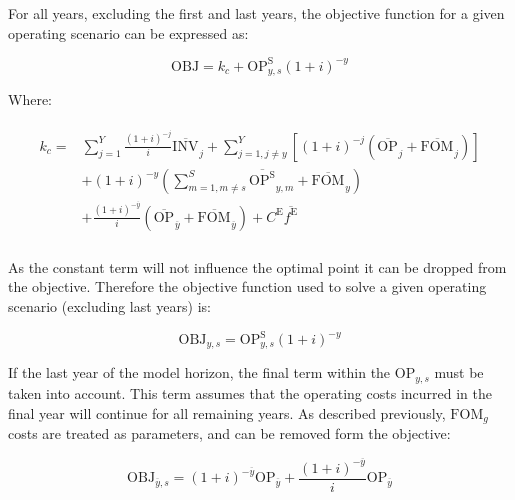 \documentclass{article}
\newcommand{\sYears}{Y}
\newcommand{\sScenarios}{S}
\newcommand{\iGenerator}{g}
\newcommand{\iYear}{y}
\newcommand{\iYearTerminal}{\overline{\iYear}}
\newcommand{\iYearAlias}{j}
\newcommand{\iScenario}{s}
\newcommand{\iScenarioAlias}{m}
\newcommand{\cOperatingCost}[1][\iYear,\iScenario]{\mathrm{OP}_{#1}}
\newcommand{\cFixedOperationsMaintenanceCost}[1][\iGenerator]{\mathrm{FOM}_{#1}}
\newcommand{\cInvestmentCost}[1][\iYear]{\mathrm{INV}_{#1}}
\newcommand{\cInterestRate}{i}
\newcommand{\cEmissionsTargetViolationPenalty}{C^{\mathrm{E}}}
\newcommand{\cObjectiveFunction}{\mathrm{OBJ}}
\newcommand{\cOperatingCostScenario}[1][\iYear,\iScenario]{\mathrm{OP}^{\mathrm{\sScenarios}}_{#1}}
\newcommand{\vEmissionsTargetViolation}{f^{\mathrm{E}}}
\begin{document}
For all years, excluding the first and last years, the objective function for a given operating scenario can be expressed as:

\begin{equation}
	\cObjectiveFunction = k_{c} + \cOperatingCostScenario(1+\cInterestRate)^{-\iYear}
\end{equation}

Where:

\begin{align}
\begin{split}
	k_{c} = & \sum\limits_{\iYearAlias=1}^{\sYears} \frac{(1+\cInterestRate)^{-\iYearAlias}}{\cInterestRate}\overline{\cInvestmentCost[]}_{\iYearAlias} + \sum\limits_{\iYearAlias=1, \iYearAlias \neq \iYear}^{\sYears} \left[(1+\cInterestRate)^{-\iYearAlias} (\overline{\cOperatingCost[]}_{\iYearAlias} + \overline{\cFixedOperationsMaintenanceCost[]}_{\iYearAlias}) \right]\\
	& + (1 + \cInterestRate)^{-\iYear}\left(\sum\limits_{\iScenarioAlias = 1,\iScenarioAlias\neq \iScenario}^{\sScenarios}\overline{\cOperatingCostScenario[]}_{\iYear,\iScenarioAlias} + \overline{\cFixedOperationsMaintenanceCost[]}_{\iYear}\right)\\
	& + \frac{(1+\cInterestRate)^{-\iYearTerminal}}{\cInterestRate} \left(\overline{\cOperatingCost[]}_{\iYearTerminal} + \overline{\cFixedOperationsMaintenanceCost[]}_{\iYearTerminal} \right) + \cEmissionsTargetViolationPenalty \overline{\vEmissionsTargetViolation}\\
\end{split}
\end{align}

As the constant term will not influence the optimal point it can be dropped from the objective. Therefore the objective function used to solve a given operating scenario (excluding last years) is:

\begin{equation}
	\cObjectiveFunction_{\iYear,\iScenario} = \cOperatingCostScenario(1+\cInterestRate)^{-\iYear}
\end{equation}

If the last year of the model horizon, the final term within the $\cOperatingCost$ must be taken into account. This term assumes that the operating costs incurred in the final year will continue for all remaining years. As described previously, $\cFixedOperationsMaintenanceCost$ costs are treated as parameters, and can be removed form the objective:

\begin{equation}
	\cObjectiveFunction_{\iYearTerminal,\iScenario} = (1+\cInterestRate)^{-\iYearTerminal} \cOperatingCost[\iYearTerminal] + \frac{(1+\cInterestRate)^{-\iYearTerminal}}{\cInterestRate} \cOperatingCost[\iYearTerminal]
\end{equation}
\end{document}
